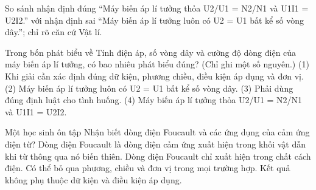 \begin{bt}
So sánh nhận định đúng “Máy biến áp lí tưởng thỏa U2/U1 = N2/N1 và U1I1 = U2I2.” với nhận định sai “Máy biến áp lí tưởng luôn có U2 = U1 bất kể số vòng dây.”; chỉ rõ căn cứ Vật lí.
\end{bt}

\begin{ex}
Trong bốn phát biểu về Tính điện áp, số vòng dây và cường độ dòng điện của máy biến áp lí tưởng, có bao nhiêu phát biểu đúng? (Chỉ ghi một số nguyên.) (1) Khi giải cần xác định đúng dữ kiện, phương chiều, điều kiện áp dụng và đơn vị. (2) Máy biến áp lí tưởng luôn có U2 = U1 bất kể số vòng dây. (3) Phải dùng đúng định luật cho tình huống. (4) Máy biến áp lí tưởng thỏa U2/U1 = N2/N1 và U1I1 = U2I2.
\end{ex}

\begin{ex}
Một học sinh ôn tập Nhận biết dòng điện Foucault và các ứng dụng của cảm ứng điện từ?
\choice
{\True Dòng điện Foucault là dòng điện cảm ứng xuất hiện trong khối vật dẫn khi từ thông qua nó biến thiên.}
{Dòng điện Foucault chỉ xuất hiện trong chất cách điện.}
{Có thể bỏ qua phương, chiều và đơn vị trong mọi trường hợp.}
{Kết quả không phụ thuộc dữ kiện và điều kiện áp dụng.}
\end{ex}


